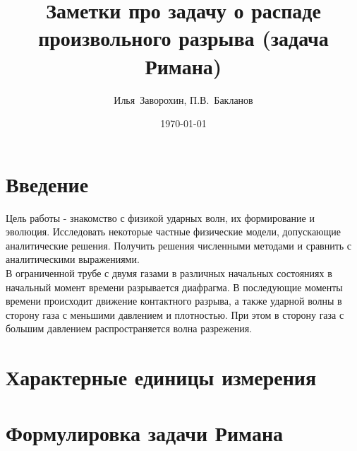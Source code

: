 \documentclass[a4paper,12pt]{extarticle}
\begin{document}
\title{\large
 Заметки про задачу о распаде произвольного разрыва (задача Римана)
}

\author{Илья~Заворохин, П.В.~Бакланов}

\date{\today}

\maketitle

\tableofcontents






\section{Введение}

Цель работы - знакомство с физикой ударных волн, их формирование и эволюция.
Исследовать некоторые частные физические модели, допускающие аналитические решения. 
Получить решения численными методами и сравнить с аналитическими выражениями.
\\

В ограниченной трубе с двумя газами в различных начальных состояниях в начальный момент времени разрывается диафрагма. В последующие моменты времени происходит движение контактного разрыва, а также ударной волны в сторону газа с меньшими давлением и плотностью. При этом в сторону газа с большим давлением распространяется волна разрежения.


\section{Характерные единицы измерения}


\section{Формулировка задачи Римана}
\end{document}
